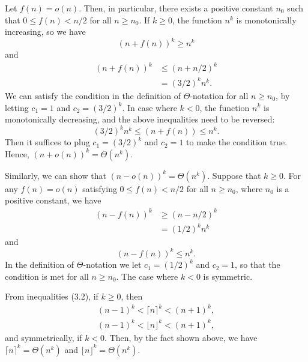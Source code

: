 Let $f(n)=o(n)$.
Then, in particular, there exists a positive constant $n_0$ such that $0\le f(n)<n/2$ for all $n\ge n_0$.
If $k\ge0$, the function $n^k$ is monotonically increasing, so we have
\[
    (n+f(n))^k \ge n^k
\]
and
\begin{align*}
    (n+f(n))^k &\le (n+n/2)^k \\
    &= (3/2)^kn^k.
\end{align*}
We can satisfy the condition in the definition of $\Theta$-notation for all $n\ge n_0$, by letting $c_1=1$ and $c_2=(3/2)^k$.
In case where $k<0$, the function $n^k$ is monotonically decreasing, and the above inequalities need to be reversed:
\[
    (3/2)^kn^k \le (n+f(n)) \le n^k.
\]
Then it suffices to plug $c_1=(3/2)^k$ and $c_2=1$ to make the condition true.
Hence, $(n+o(n))^k=\Theta(n^k)$.

Similarly, we can show that $(n-o(n))^k=\Theta(n^k)$.
Suppose that $k\ge0$.
For any $f(n)=o(n)$ satisfying $0\le f(n)<n/2$ for all $n\ge n_0$, where $n_0$ is a positive constant, we have
\begin{align*}
    (n-f(n))^k &\ge (n-n/2)^k \\
    &= (1/2)^kn^k
\end{align*}
and
\[
    (n-f(n))^k \le n^k.
\]
In the definition of $\Theta$-notation we let $c_1=(1/2)^k$ and $c_2=1$, so that the condition is met for all $n\ge n_0$.
The case where $k<0$ is symmetric.

From inequalities (3.2), if $k\ge0$, then
\begin{gather*}
    (n-1)^k < \lceil n\rceil^k < (n+1)^k, \\
    (n-1)^k < \lfloor n\rfloor^k < (n+1)^k,
\end{gather*}
and symmetrically, if $k<0$.
Then, by the fact shown above, we have $\lceil n\rceil^k=\Theta(n^k)$ and $\lfloor n\rfloor^k=\Theta(n^k)$.
